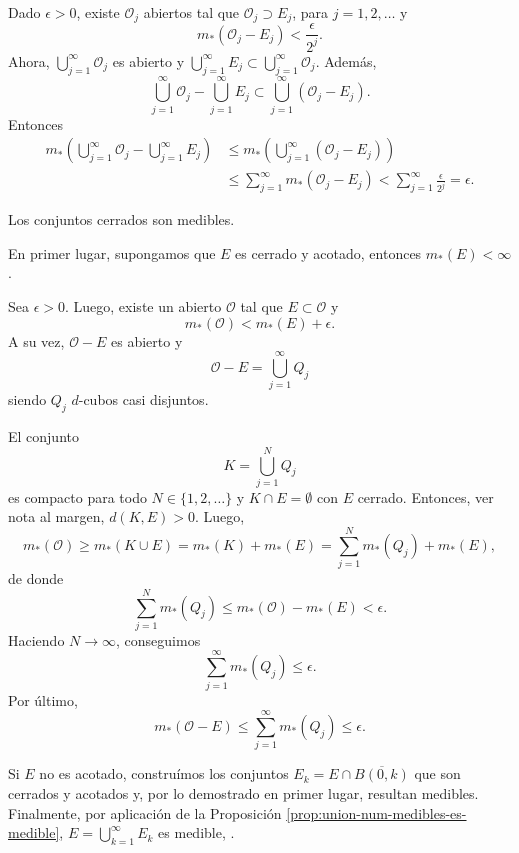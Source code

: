 \begin{demo}
Dado $\epsilon>0$, existe $\mathcal{O}_j$ abiertos tal que $\mathcal{O}_j\supset E_j$, para $j=1,2,\dots$
y 
\[
m_{*}(\mathcal{O}_j-E_j)<\frac{\epsilon}{2^j}.
\]
Ahora, $\bigcup\limits_{j=1}^{\infty} \mathcal{O}_j$ es abierto y $\bigcup\limits_{j=1}^{\infty} E_j \subset \bigcup\limits_{j=1}^{\infty} \mathcal{O}_j$.
Adem\'as, 
\[
\bigcup\limits_{j=1}^{\infty} \mathcal{O}_j-\bigcup\limits_{j=1}^{\infty} E_j
\subset
\bigcup\limits_{j=1}^{\infty}\left( \mathcal{O}_j- E_j\right).
\]
Entonces
\[
\begin{split}
m_{*}\left(\bigcup\limits_{j=1}^{\infty} \mathcal{O}_j-\bigcup\limits_{j=1}^{\infty} E_j\right)
&\leq
m_{*}\left(\bigcup\limits_{j=1}^{\infty}\left( \mathcal{O}_j- E_j\right)\right)
\\
&\leq 
\sum\limits_{j=1}^{\infty} m_{*}\left( \mathcal{O}_j- E_j\right)<
\sum\limits_{j=1}^{\infty} \frac{\epsilon}{2^j}=
\epsilon.
\end{split}
\]
\end{demo}


\begin{proposicion}{}
Los conjuntos cerrados son medibles.
\end{proposicion}

\begin{demo}{}
En primer lugar, supongamos que $E$ es cerrado y  acotado, entonces $m_{*}(E)<\infty$. 

Sea $\epsilon>0$. Luego, existe un abierto $\mathcal{O}$ tal que 
$E\subset \mathcal{O}$ y 
\[
m_{*}(\mathcal{O})<m_{*}(E)+\epsilon.
\]
A su vez, $\mathcal{O}-E$ es abierto y 
\[
\mathcal{O}-E=\bigcup\limits_{j=1}^{\infty} Q_j
\]
siendo $Q_j$ $d$-cubos casi disjuntos. 

El conjunto 
\[
K=\bigcup\limits_{j=1}^N Q_j
\]
es compacto para todo $N \in \{1,2,\ldots\}$ y $K\cap E=\emptyset$ con $E$ cerrado.
Entonces, ver nota al margen,  $d(K,E)>0$. Luego, 
\[
m_{*}(\mathcal{O})\geq  m_{*}(K\cup E)=m_{*}(K)+m_{*}(E)=
\sum\limits_{j=1}^N m_{*}(Q_j)+m_{*}(E),
\]
de donde
\[
\sum\limits_{j=1}^N m_{*}(Q_j) \leq m_{*}(\mathcal{O})-m_{*}(E)<\epsilon.
\]
Haciendo $N\to \infty$, conseguimos
\[
\sum\limits_{j=1}^{\infty} m_{*}(Q_j)\leq \epsilon.
\]
Por \'ultimo, 
\[
m_{*}(\mathcal{O}-E)\leq \sum\limits_{j=1}^{\infty} m_{*}(Q_j)\leq \epsilon.
\]

Si $E$ no es acotado, constru\'imos  los conjuntos $E_k=E\cap \overline{B(0,k)}$ que son cerrados y acotados y, por lo demostrado en primer lugar, resultan medibles.
Finalmente, por aplicaci\'on de la Proposici\'on \ref{prop:union-num-medibles-es-medible}, 
$E=\bigcup\limits_{k=1}^{\infty}E_k$ es medible, . 
\end{demo}

